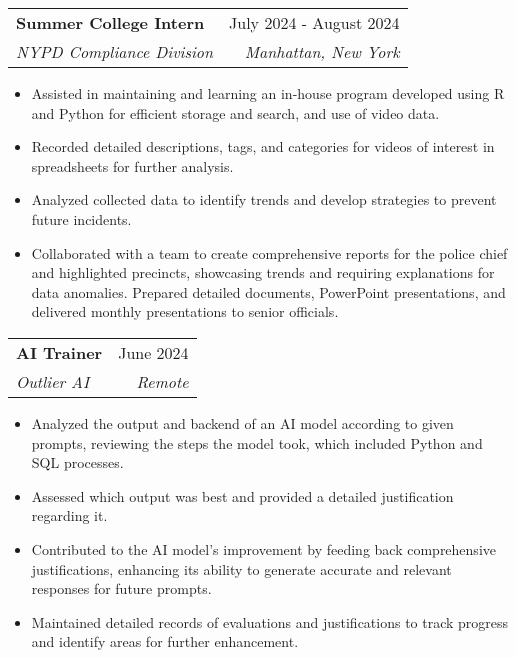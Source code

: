 \documentclass[letterpaper,11pt]{article}
\makeatletter
\newcommand{\resumeItem}[1]{
  \item\small{
    {#1 \vspace{-2pt}}
  }
}
\newcommand{\resumeSubheading}[4]{
  \vspace{-2pt}\item
    \begin{tabular*}{0.97\textwidth}[t]{l@{\extracolsep{\fill}}r}
      \textbf{#1} & #2 \\
      \textit{\small#3} & \textit{\small #4} \\
    \end{tabular*}\vspace{-7pt}
}
\newcommand{\resumeItemListStart}{\begin{itemize}}
\newcommand{\resumeItemListEnd}{\end{itemize}\vspace{-5pt}}
\makeatother
\begin{document}
    \resumeSubheading
      {Summer College Intern}{July 2024 - August 2024}
      {NYPD Compliance Division}{Manhattan, New York}
      \resumeItemListStart
        \resumeItem{Assisted in maintaining and learning an in-house program developed using R and Python for efficient storage and search, and use of video data.}
        \resumeItem{Recorded detailed descriptions, tags, and categories for videos of interest in spreadsheets for further analysis.}
        \resumeItem{Analyzed collected data to identify trends and develop strategies to prevent future incidents.}
        \resumeItem{Collaborated with a team to create comprehensive reports for the police chief and highlighted precincts, showcasing trends and requiring explanations for data anomalies. Prepared detailed documents, PowerPoint presentations, and delivered monthly presentations to senior officials.}
      \resumeItemListEnd

    \resumeSubheading
      {AI Trainer}{June 2024}
      {Outlier AI}{Remote}
      \resumeItemListStart
        \resumeItem{Analyzed the output and backend of an AI model according to given prompts, reviewing the steps the model took, which included Python and SQL processes.}
        
        \resumeItem{Assessed which output was best and provided a detailed justification regarding it.}
        
        \resumeItem{Contributed to the AI model's improvement by feeding back comprehensive justifications, enhancing its ability to generate accurate and relevant responses for future prompts.}
        
        \resumeItem{Maintained detailed records of evaluations and justifications to track progress and identify areas for further enhancement.}
      \resumeItemListEnd

        
        
\end{document}
